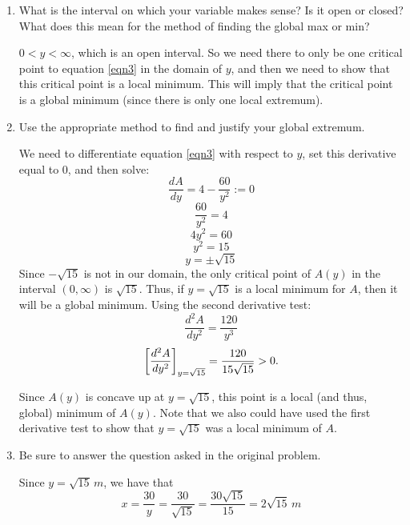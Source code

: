 \documentclass{ximera}
\begin{document}
\begin{problem}
\begin{enumerate}
    \item  What is the interval on which your variable makes sense?
      Is it open or closed?
      What does this mean for the method of finding the global max or min?
      \begin{explanation}
        $0 < y < \infty$, which is an open interval.
        So we need there to only be one critical point to equation \eqref{eqn3} in the domain of $y$, and then we need to show that this critical point is a local minimum.
        This will imply that the critical point is a global minimum (since there is only one local extremum).  
      \end{explanation}
		
    \item  Use the appropriate method to find and justify your global extremum.
      \begin{explanation}
        We need to differentiate equation \eqref{eqn3} with respect to $y$, set this derivative equal to $0$, and then solve:
        $$ \dfrac{dA}{dy} = 4 - \dfrac{60}{y^2} :=0 $$
        $$ \dfrac{60}{y^2} = 4 $$
        $$ 4y^2 = 60 $$
        $$ y^2 = 15 $$
        $$ y = \pm \sqrt{15} $$
        Since $-\sqrt{15}$ is not in our domain, the only critical point of $A(y)$ in the interval $(0,\infty)$ is $\sqrt{15}$.  
        Thus, if $y=\sqrt{15}$ is a local minimum for $A$, then it will be a global minimum.  
        Using the second derivative test:
        $$ \dfrac{d^2A}{dy^2} = \dfrac{120}{y^3} $$
        $$ \bigg[ \dfrac{d^2A}{dy^2} \bigg]_{y=\sqrt{15}} = \dfrac{120}{15 \sqrt{15}} > 0. $$
        
        Since $A(y)$ is concave up at $y=\sqrt{15}$, this point is a local (and thus, global) minimum of $A(y)$.  
        Note that we also could have used the first derivative test to show that $y=\sqrt{15}$ was a local minimum of $A$.
      \end{explanation}
      
    \item  Be sure to answer the question asked in the original problem.
      \begin{explanation}
        Since $y=\sqrt{15} \, m$, we have that
        $$ x = \dfrac{30}{y} = \dfrac{30}{\sqrt{15}} = \dfrac{30 \sqrt{15}}{15} = 2 \sqrt{15} \, m $$
      \end{explanation}
    \end{enumerate}
\end{problem}
\end{document}
